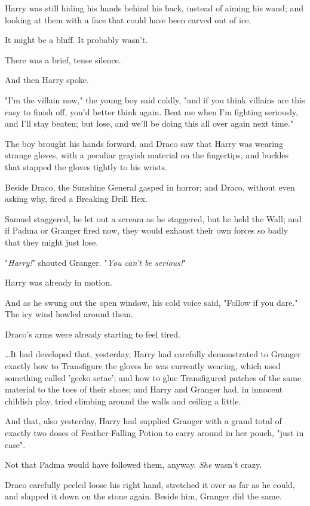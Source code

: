 Harry was still hiding his hands behind his back, instead of aiming his wand; 
and looking at them with a face that could have been carved out of ice.

It might be a bluff. It probably wasn't.

There was a brief, tense silence.

And then Harry spoke.

"I'm the villain now," the young boy said coldly, "and if you think villains 
are this easy to finish off, you'd better think again. Beat me when I'm 
fighting seriously, and I'll stay beaten; but lose, and we'll be doing this all 
over again next time."

The boy brought his hands forward, and Draco saw that Harry was wearing strange 
gloves, with a peculiar grayish material on the fingertips, and buckles that 
stapped the gloves tightly to his wrists.

Beside Draco, the Sunshine General gasped in horror; and Draco, without even 
asking why, fired a Breaking Drill Hex.

Samuel staggered, he let out a scream as he staggered, but he held the Wall; 
and if Padma or Granger fired now, they would exhaust their own forces so badly 
that they might just lose.

"\emph{Harry!}" shouted Granger. "\emph{You can't be serious!}"

Harry was already in motion.

And as he swung out the open window, his cold voice said, "Follow if you dare."
\sbreak
The icy wind howled around them.

Draco's arms were already starting to feel tired.

{\ldots}It had developed that, yesterday, Harry had carefully demonstrated to 
Granger exactly how to Transfigure the gloves he was currently wearing, which 
used something called 'gecko setae'; and how to glue Transfigured patches of 
the same material to the toes of their shoes; and Harry and Granger had, in 
innocent childish play, tried climbing around the walls and ceiling a little.

And that, also yesterday, Harry had supplied Granger with a grand total of 
exactly two doses of Feather-Falling Potion to carry around in her pouch, "just 
in case".

Not that Padma would have followed them, anyway. \emph{She} wasn't crazy.

Draco carefully peeled loose his right hand, stretched it over as far as he 
could, and slapped it down on the stone again. Beside him, Granger did the same.

